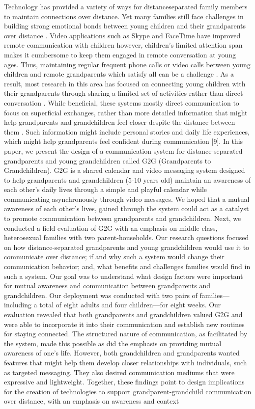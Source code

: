 Technology has provided a variety of ways for distanceseparated family members to maintain connections over
distance. Yet many families still face challenges in building
strong emotional bonds between young children and their
grandparents over distance .
Video applications such as Skype and FaceTime have
improved remote communication with children
however, children’s limited attention span makes it
cumbersome to keep them engaged in remote conversation
at young ages. Thus, maintaining regular frequent phone
calls or video calls between young children and remote
grandparents which satisfy all can be a challenge . As a
result, most research in this area has focused on connecting
young children with their grandparents through sharing a
limited set of activities rather than direct conversation
. While beneficial, these systems mostly direct
communication to focus on superficial exchanges, rather
than more detailed information that might help
grandparents and grandchildren feel closer despite the
distance between them . Such information might include
personal stories and daily life experiences, which might
help grandparents feel confident during communication [9].
In this paper, we present the design of a communication
system for distance-separated grandparents and young
grandchildren called G2G (Grandparents to Grandchildren).
G2G is a shared calendar and video messaging system
designed to help grandparents and grandchildren (5-10
years old) maintain an awareness of each other’s daily lives
through a simple and playful calendar while communicating
asynchronously through video messages. We hoped that a
mutual awareness of each other’s lives, gained through the
system could act as a catalyst to promote communication
between grandparents and grandchildren.
Next, we conducted a field evaluation of G2G with an
emphasis on middle class, heterosexual families with two
parent-households. Our research questions focused on how
distance-separated grandparents and young grandchildren
would use it to communicate over distance; if and why such
a system would change their communication behavior; and,
what benefits and challenges families would find in such a
system. Our goal was to understand what design factors
were important for mutual awareness and communication
between grandparents and grandchildren. Our deployment
was conducted with two pairs of families—including a total
of eight adults and four children—for eight weeks.
Our evaluation revealed that both grandparents and
grandchildren valued G2G and were able to incorporate it
into their communication and establish new routines for
staying connected. The structured nature of communication,
as facilitated by the system, made this possible as did the
emphasis on providing mutual awareness of one’s life.
However, both grandchildren and grandparents wanted
features that might help them develop closer relationships
with individuals, such as targeted messaging. They also
desired communication mediums that were expressive and
lightweight. Together, these findings point to design
implications for the creation of technologies to support
grandparent-grandchild communication over distance, with
an emphasis on awareness and context

